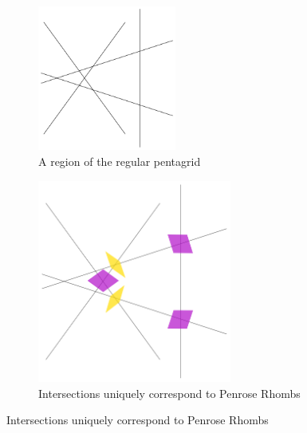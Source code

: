 \documentclass[
  oneside,
  11pt, a4paper,
  footinclude=true,
  headinclude=true,
  cleardoublepage=empty
]{scrbook}
\begin{document}
\begin{figure}[H]
\centering
\begin{subfigure}[b]{\textwidth}
\centering
\includegraphics[width=0.5\textwidth]{PentagridConstruct}
\caption{A region of the regular pentagrid}
\end{subfigure}

\begin{subfigure}[b]{\textwidth}
\centering
\includegraphics[width=0.7\textwidth]{RhombPlacement}
\caption{Intersections uniquely correspond to Penrose Rhombs}
\end{subfigure}


\end{figure}
\end{document}
